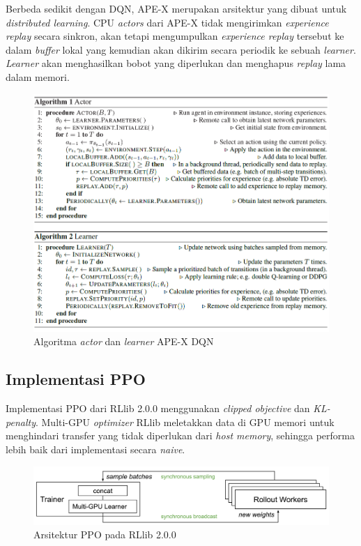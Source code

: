 Berbeda sedikit dengan DQN, APE-X merupakan arsitektur yang dibuat untuk \emph{distributed learning}.
CPU \emph{actors} dari APE-X tidak mengirimkan \emph{experience replay} secara sinkron, akan tetapi mengumpulkan \emph{experience replay}
tersebut ke dalam \emph{buffer} lokal yang kemudian akan dikirim secara periodik ke sebuah \emph{learner}.
\emph{Learner} akan menghasilkan bobot yang diperlukan dan menghapus \emph{replay} lama dalam memori.


\begin{figure}[H]
  \centering
    \includegraphics[scale=0.65]{gambar/apex_actor_learner_algorithm.png}
    \caption{Algoritma \emph{actor} dan \emph{learner} APE-X DQN}
    \label{fig:apexActorLearnerAlgorithm}
\end{figure}

\subsection{Implementasi PPO}
Implementasi PPO dari RLlib 2.0.0 menggunakan \emph{clipped objective} dan \emph{KL-penalty}.
Multi-GPU \emph{optimizer} RLlib meletakkan data di GPU memori untuk menghindari transfer yang tidak diperlukan
dari \emph{host memory}, sehingga performa lebih baik dari implementasi secara \emph{naive}.

\begin{figure}[H]
  \centering
    \includegraphics[scale=0.6]{gambar/rllib_ppo_architecture.png}
    \caption{Arsitektur PPO pada RLlib 2.0.0 \citep{rllibDocumentation}}
    \label{fig:rllib_ppo_architecture}
\end{figure}

